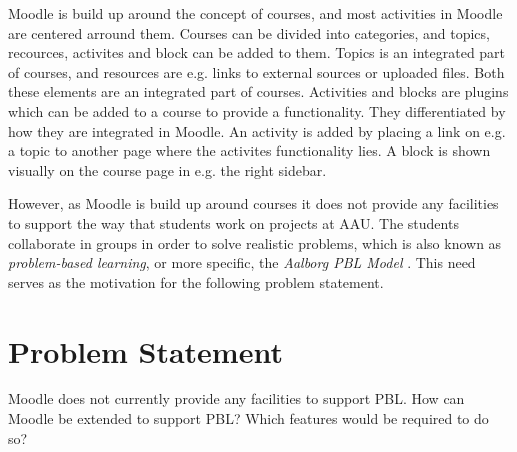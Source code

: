 Moodle is build up around the concept of courses, and most activities in Moodle are centered arround them. Courses can be divided into categories, and topics, recources, activites and block can be added to them. Topics is an integrated part of courses, and resources are e.g. links to external sources or uploaded files. Both these elements are an integrated part of courses. Activities and blocks are plugins which can be added to a course to provide a functionality. They differentiated by how they are integrated in Moodle. An activity is added by placing a link on e.g. a topic to another page where the activites functionality lies. A block is shown visually on the course page in e.g. the right sidebar. 


However, as Moodle is build up around courses it does not provide any facilities to support the way that students work on projects at AAU. The students collaborate in groups in order to solve realistic problems, which is also known as \emph{problem-based learning}, or more specific, the \emph{Aalborg PBL Model} \citep{pbl}. This need serves as the motivation for the following problem statement.

\section{Problem Statement}
Moodle does not currently provide any facilities to support PBL. How can Moodle be extended to support PBL? Which features would be required to do so?